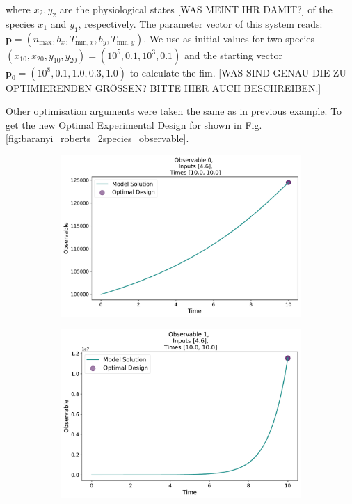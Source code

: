 \documentclass[10pt,A4paper]{article}
\newcommand{\mbp}{\mathbf{p}}
\begin{document}
where $x_2, y_2$ are the physiological states [WAS MEINT IHR DAMIT?] of the species $x_1$ and $y_1$, respectively.
The parameter vector of this system reads: $\mbp = (n_\text{max}, b_x, T_{\text{min}, x}, b_y, T_{\text{min}, y})$.
We use as initial values for two species $(x_{10}, x_{20}, y_{10}, y_{20}) = (10^5, 0.1, 10^3, 0.1)$ and the starting vector $\mbp_0= (10^8, 0.1, 1.0, 0.3, 1.0)$ to calculate the \ac{fim}.
[WAS SIND GENAU DIE ZU OPTIMIERENDEN GRÖSSEN? BITTE HIER AUCH BESCHREIBEN.]

Other optimisation arguments were taken the same as in previous example.
To get the new Optimal Experimental Design for shown in Fig. \ref{fig:baranyi_roberts_2species_observable}.
\begin{figure}[H]
    \begin{subfigure}{.9\textwidth}
        \centering
        \includegraphics[scale=0.35]{Figures/Observable_Results_baranyi_roberts_ode_fisher_determinant_2species_rel_sensit_cont_2times_2temps_000_x_00.pdf}
      \end{subfigure}    
      \begin{subfigure}{.9\textwidth}
        \centering
        \includegraphics[scale=0.35]{Figures/Observable_Results_baranyi_roberts_ode_fisher_determinant_2species_rel_sensit_cont_2times_2temps_000_x_01.pdf}
      \end{subfigure}
    \end{figure}%
\end{document}
